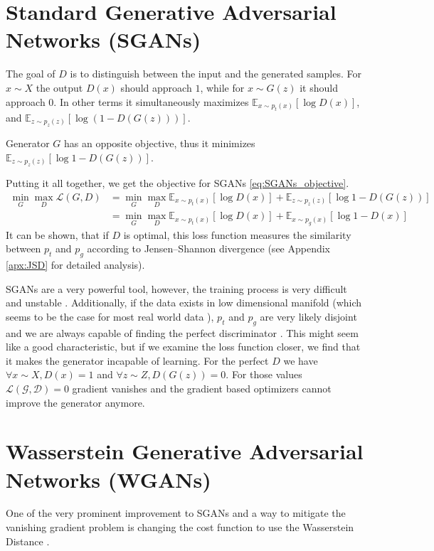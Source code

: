 \section{Standard Generative Adversarial Networks (SGANs)}
The goal of $D$ is to distinguish between the input and the generated samples. For $x
\sim X$ the output $D(x)$ should approach $1$, while for $x \sim G(z)$ it should
approach $0$. In other terms it simultaneously maximizes $\mathbb{E}_{x \sim
  p_t(x)}[\log{D(x)}]$, and $\mathbb{E}_{z \sim p_z(z)}[\log{(1 - D(G(z)))}]$.

Generator $G$ has an opposite objective, thus it minimizes $\mathbb{E}_{z
  \sim p_z(z)}[\log{1 - D(G(z))}]$.

Putting it all together, we get the objective for SGANs \eqref{eq:SGANs_objective}.
\begin{equation}
  \label{eq:SGANs_objective}
  \begin{split}
    \min_G\max_D\mathcal{L}(G, D) & = \min_G\max_D \mathbb{E}_{x \sim p_t(x)}[\log{D(x)}] +  \mathbb{E}_{z \sim p_z(z)}[\log{1 - D(G(z))}] \\
    & = \min_G\max_D \mathbb{E}_{x \sim p_t(x)}[\log{D(x)}] +  \mathbb{E}_{x \sim p_g(x)}[\log{1 - D(x)}]
  \end{split}
\end{equation}
It can be shown, that if $D$ is optimal, this loss function measures the similarity between 
$p_t$ and $p_g$ according to Jensen–Shannon divergence (see Appendix
\ref{apx:JSD} for detailed analysis). 

SGANs are a very powerful tool, however, the training process is very difficult
and unstable \cite{salimans2016improved}. Additionally, if the data exists in
low dimensional manifold (which seems to be the case for most real world data
\cite{narayanan2010proceedings}), $p_t$ and $p_g$ are very likely disjoint and we are always capable of finding the perfect discriminator 
\cite{arjovsky2017principled}. This might seem like a good
characteristic, but if we examine the loss function closer, we find that it
makes the generator incapable of learning. For the perfect $D$ we have $\forall x
\sim X, D(x) = 1$ and $\forall z \sim Z, D(G(z)) = 0$. For those values
$\mathcal{L(G,D)} = 0$ gradient vanishes and the gradient based optimizers cannot improve the
generator anymore.
\section{Wasserstein Generative Adversarial Networks (WGANs)}
One of the very prominent improvement to SGANs and a way to mitigate the
vanishing gradient problem is changing the cost function to use the Wasserstein
Distance \cite{arjovsky2017wasserstein}.

